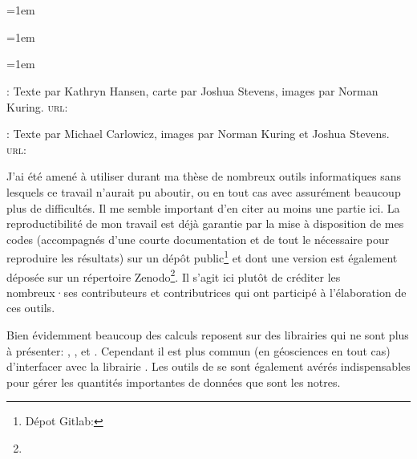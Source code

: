 
\chapter*{\bibname}
\mtcaddchapter[\bibname]
\markboth{\bibname}{}
\label{bib}

{
  \nocite{quenouille_1966}
  \emergencystretch=1em
  \printbibliography[heading=none, filter=normal]
}

\unsection{\bibdataTitle}
\label{bib:data}

{
  \emergencystretch=1em
  \printbibliography[heading=none, type=dataset]
}

\unsection{\bibillustrationTitle}
\label{bib:illustration}

{
  \setlength{\parindent}{0pt}
  \emergencystretch=1em

  : 
  Texte par Kathryn Hansen, carte par Joshua Stevens, images par Norman Kuring.
  \textsc{url:} 

  \medskip

  : 
  Texte par Michael Carlowicz, images par Norman Kuring et Joshua Stevens.
  \textsc{url:} 
}

\unsection{\bibsoftwareTitle}
\label{bib:software}

J'ai été amené à utiliser durant ma thèse de nombreux outils informatiques sans lesquels ce travail n'aurait pu aboutir, ou en tout cas avec assurément beaucoup plus de difficultés.
Il me semble important d'en citer au moins une partie ici.
La reproductibilité de mon travail est déjà garantie par la mise à disposition de mes codes (accompagnés d'une courte documentation et de tout le nécessaire pour reproduire les résultats) sur un dépôt public\footnote{%
  Dépot Gitlab: }
et dont une version est également déposée sur un répertoire Zenodo\footnote{}.
Il s'agit ici plutôt de créditer les nombreux·ses contributeurs et contributrices qui ont participé à l'élaboration de ces outils.

Bien évidemment beaucoup des calculs reposent sur des librairies qui ne sont plus à présenter: , , et .
Cependant il est plus commun (en géosciences en tout cas) d'interfacer avec la librairie .
Les outils de  se sont également avérés indispensables pour gérer les quantités importantes de données que sont les notres.

